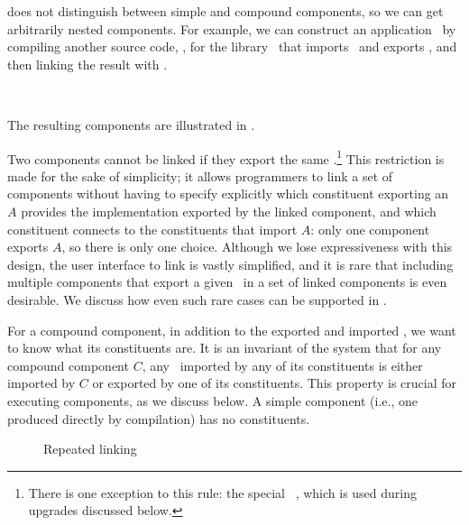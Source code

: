  does not distinguish between simple and compound
components, so we can get arbitrarily nested components.  For example,
we can construct an application \coolcrypto\
by compiling another source code, ,
for the library \ironsec\
that imports \fortio\ and exports \fortsec,
and then linking the result with \ironlink.

\\

The resulting components are illustrated in .

Two components cannot be linked if they export the same
\apiN.\!\footnote{There is one exception to this rule:
the special \apiN\ \upgapi, which is used during upgrades discussed below.}
This restriction is made for the sake of simplicity;
it allows programmers to link a set of components
without having to specify explicitly
which constituent exporting an \apiN\ $A$
provides the implementation exported by the linked component,
and which constituent connects to the constituents that import $A$:
only one component exports $A$, so there is only one choice.
Although we lose expressiveness with this design,
the user interface to link is vastly simplified,
and it is rare that including multiple components that export a given \apiN\
in a set of linked components is even desirable.
We discuss how even such rare cases can be supported in
\secref{advancedops}.

For a compound component,
in addition to the exported and imported \apisN,
we want to know what its constituents are.
It is an invariant of the system
that for any compound component $C$,
any \apiN\ imported by any of its constituents
is either imported by $C$ or exported by one of its constituents.
This property is crucial for executing components, as we discuss below.
A simple component (i.e., one produced directly by compilation)
has no constituents.

\begin{figure}
\begin{center}

\end{center}
\caption{Repeated linking}
\end{figure}

